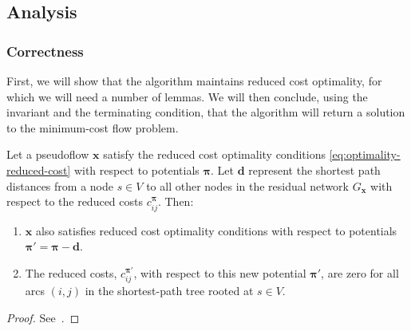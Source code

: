 \subsection{Analysis} \label{sec:impl-ssp-analysis}

\subsubsection{Correctness}

First, we will show that the algorithm maintains reduced cost optimality, for which we will need a number of lemmas. We will then conclude, using the invariant and the terminating condition, that the algorithm will return a solution to the minimum-cost flow problem.\\

\begin{lemma} \label{lemma:ssp-reduced-costs}
Let a pseudoflow $\mathbf{x}$ satisfy the reduced cost optimality conditions \cref{eq:optimality-reduced-cost} with respect to potentials $\boldsymbol{\pi}$. Let $\mathbf{d}$ represent the shortest path distances from a node $s \in V$ to all other nodes in the residual network $G_{\mathbf{x}}$ with respect to the reduced costs $c^{\boldsymbol{\pi}}_{ij}$. Then:
    
\begin{enumerate}[label=(\alph*)]
  \item $\mathbf{x}$ also satisfies reduced cost optimality conditions with respect to potentials $\boldsymbol{\pi}' = \boldsymbol{\pi} - \mathbf{d}$.
  \item The reduced costs, $c^{\boldsymbol{\pi}'}_{ij}$, with respect to this new potential $\boldsymbol{\pi}'$, are zero for all arcs $(i,j)$ in the shortest-path tree rooted at $s \in V$.
\end{enumerate}
\end{lemma}
\begin{proof}
See~\cite[p.~320]{Ahuja:1993}.
\end{proof}

